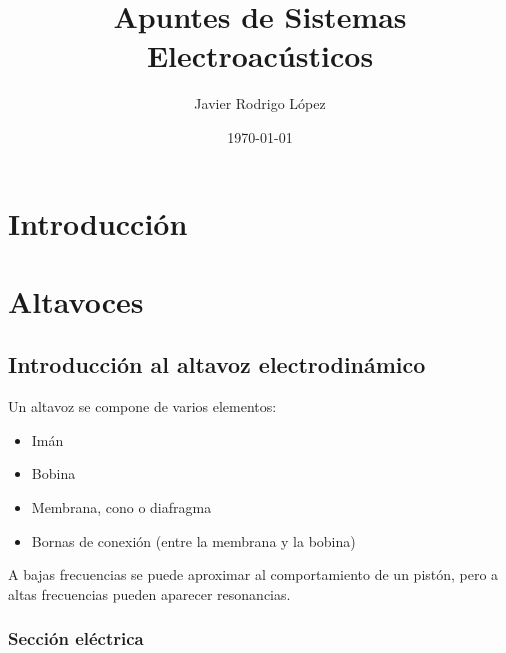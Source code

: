 \documentclass[12pt, a4paper]{article}
\title{Apuntes de Sistemas Electroacústicos}
\author{Javier Rodrigo López}
\date{\today}
\begin{document}
\maketitle

\tableofcontents

\newpage
\section*{Introducción}

\section{Altavoces}

\subsection{Introducción al altavoz electrodinámico}


Un altavoz se compone de varios elementos:

\begin{itemize}
    \item Imán
    \item Bobina
    \item Membrana, cono o diafragma
    \item Bornas de conexión (entre la membrana y la bobina)
\end{itemize}

A bajas frecuencias se puede aproximar al comportamiento de un pistón, pero a altas frecuencias pueden aparecer resonancias. 

\subsubsection{Sección eléctrica}
\end{document}
